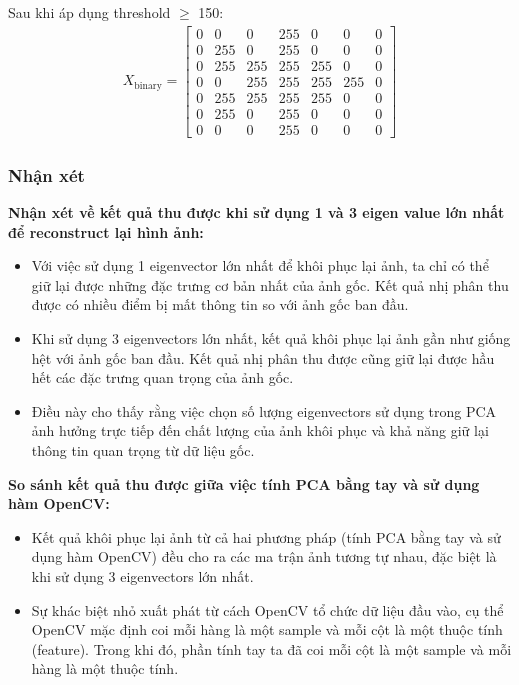 \begin{itemize}
\begin{itemize}
                    Sau khi áp dụng threshold $\geq$ 150:
                    \begin{align*}
                        X_{\text{binary}} = \begin{bmatrix}
                        0 & 0 & 0 & 255 & 0 & 0 & 0 \\
                        0 & 255 & 0 & 255 & 0 & 0 & 0 \\
                        0 & 255 & 255 & 255 & 255 & 0 & 0 \\
                        0 & 0 & 255 & 255 & 255 & 255 & 0 \\
                        0 & 255 & 255 & 255 & 255 & 0 & 0 \\
                        0 & 255 & 0 & 255 & 0 & 0 & 0 \\
                        0 & 0 & 0 & 255 & 0 & 0 & 0
                        \end{bmatrix}
                    \end{align*}
                \end{itemize}
            \end{itemize}
        \subsubsection{Nhận xét}
            \textbf{Nhận xét về kết quả thu được khi sử dụng 1 và 3 eigen value lớn nhất để reconstruct lại hình ảnh:}
            \begin{itemize}
                \item Với việc sử dụng 1 eigenvector lớn nhất để khôi phục lại ảnh, ta chỉ có thể giữ lại được những đặc trưng cơ bản nhất của ảnh gốc. Kết quả nhị phân thu được có nhiều điểm bị mất thông tin so với ảnh gốc ban đầu.
                \item Khi sử dụng 3 eigenvectors lớn nhất, kết quả khôi phục lại ảnh gần như giống hệt với ảnh gốc ban đầu. Kết quả nhị phân thu được cũng giữ lại được hầu hết các đặc trưng quan trọng của ảnh gốc.
                \item Điều này cho thấy rằng việc chọn số lượng eigenvectors sử dụng trong PCA ảnh hưởng trực tiếp đến chất lượng của ảnh khôi phục và khả năng giữ lại thông tin quan trọng từ dữ liệu gốc.
            \end{itemize}
            \textbf{So sánh kết quả thu được giữa việc tính PCA bằng tay và sử dụng hàm OpenCV:}
            \begin{itemize}
                \item Kết quả khôi phục lại ảnh từ cả hai phương pháp (tính PCA bằng tay và sử dụng hàm OpenCV) đều cho ra các ma trận ảnh tương tự nhau, đặc biệt là khi sử dụng 3 eigenvectors lớn nhất.
                \item Sự khác biệt nhỏ xuất phát từ cách OpenCV tổ chức dữ liệu đầu vào, cụ thể OpenCV mặc định coi mỗi hàng là một sample và mỗi cột là một thuộc tính (feature). Trong khi đó, phần tính tay ta đã coi mỗi cột là một sample và mỗi hàng là một thuộc tính.
            \end{itemize}
    \newpage
